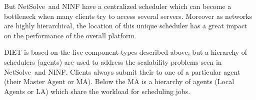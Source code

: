 \documentclass[12pt,a4paper]{book}
\newcommand{\nsl}{NetSolve}
\begin{document}
But \nsl\ and NINF have a centralized scheduler which can become a
bottleneck when many clients try to access several servers.  Moreover
as networks are highly hierarchical, the location of this unique
scheduler has a great impact on the performance of the overall
platform.

DIET is based on the five component types described above, but a
hierarchy of schedulers (agents) are used to address the scalability
problems seen in \nsl\ and NINF. Clients always submit their to one of
a particular agent (their Master Agent or MA). Below the MA is a
hierarchy of agents (Local Agents or LA) which share the workload for
scheduling jobs.

%
%
\newpage


%
%
\newpage


%
%
\newpage


%
%
\newpage



%
\newpage


%
%
\newpage






\end{document}
